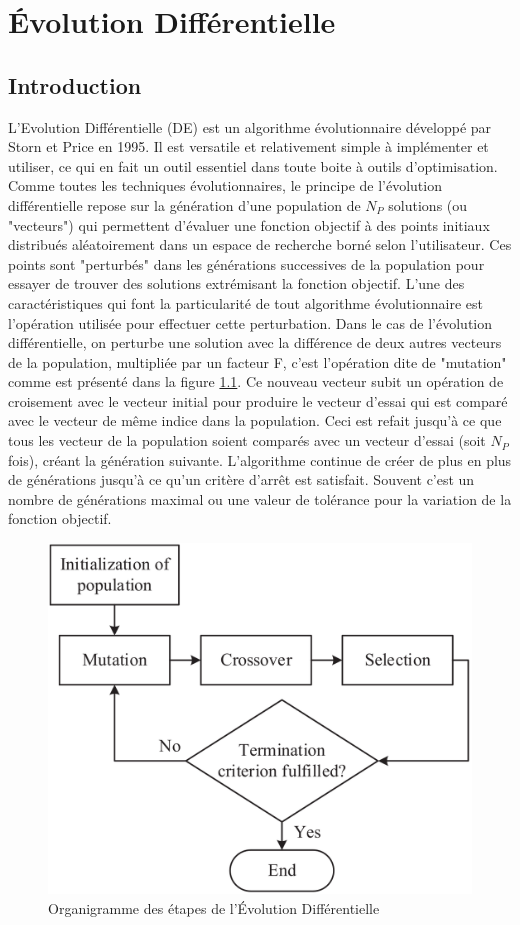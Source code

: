 \chapter{Évolution Différentielle}

\section{Introduction}
L'Evolution Différentielle (DE) est un algorithme évolutionnaire développé par Storn et Price \cite{Storn1995} en 1995. Il est versatile et relativement simple à implémenter et utiliser, ce qui en fait un outil essentiel dans toute boite à outils d'optimisation. Comme toutes les techniques évolutionnaires, le principe de l'évolution différentielle repose sur la génération d'une population de $N_P$ solutions (ou "vecteurs") qui permettent d'évaluer une fonction objectif à des points initiaux distribués aléatoirement dans un espace de recherche borné selon l'utilisateur. Ces points sont "perturbés" dans les générations successives de la population pour essayer de trouver des solutions extrémisant la fonction objectif. L'une des caractéristiques qui font la particularité de tout algorithme évolutionnaire est l'opération utilisée pour effectuer cette perturbation. Dans le cas de l'évolution différentielle, on perturbe une solution avec la différence de deux autres vecteurs de la population, multipliée par un facteur F, c'est l'opération dite de "mutation" comme est présenté dans la figure \ref{fig:deflowchart}. Ce nouveau vecteur subit un opération de croisement avec le vecteur initial pour produire le vecteur d'essai qui est comparé avec le vecteur de même indice dans la population. Ceci est refait jusqu'à ce que tous les vecteur de la population soient comparés avec un vecteur d'essai (soit $N_P$ fois), créant la génération suivante. L'algorithme continue de créer de plus en plus de générations jusqu'à ce qu'un critère d'arrêt est satisfait. Souvent c'est un nombre de générations maximal ou une valeur de tolérance pour la variation de la fonction objectif.

\begin{figure}
  \begin{center}
    \includegraphics[width=.5\textwidth]{resources/DE.png}
    \caption{Organigramme des étapes de l'Évolution Différentielle}
    \label{fig:deflowchart}
  \end{center}
\end{figure}

